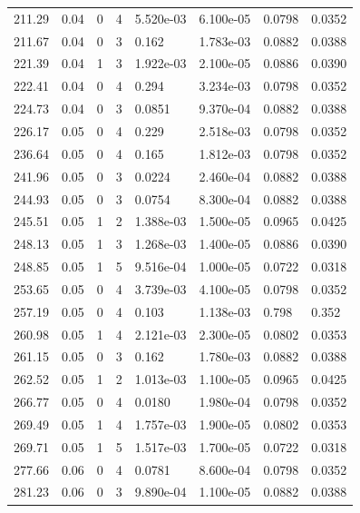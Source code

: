 \documentclass[preview]{standalone}
\begin{document}
{{{\begin{tabular}{L{1.2cm}C{1.2cm} C{0.3cm}C{0.5cm} C{1.4cm}C{1.4cm} C{1.4cm}C{1.4cm}}
  211.29  &  0.04  & 0     &  4 &  5.520e-03  & 6.100e-05  & 0.0798 &  0.0352   \\ 
  211.67  &  0.04  & 0     &  3 &  0.162  & 1.783e-03  & 0.0882 &  0.0388   \\ 
  221.39  &  0.04  & 1     &  3 &  1.922e-03  & 2.100e-05  & 0.0886 &  0.0390   \\ 
  222.41  &  0.04  & 0     &  4 &  0.294  & 3.234e-03  & 0.0798 &  0.0352   \\ 
  224.73  &  0.04  & 0     &  3 &  0.0851  & 9.370e-04  & 0.0882 &  0.0388   \\ 
  226.17  &  0.05  & 0     &  4 &  0.229  & 2.518e-03  & 0.0798 &  0.0352   \\ 
  236.64  &  0.05  & 0     &  4 &  0.165  & 1.812e-03  & 0.0798 &  0.0352   \\ 
  241.96  &  0.05  & 0     &  3 &  0.0224  & 2.460e-04  & 0.0882 &  0.0388   \\ 
  244.93  &  0.05  & 0     &  3 &  0.0754  & 8.300e-04  & 0.0882 &  0.0388   \\ 
  245.51  &  0.05  & 1     &  2 &  1.388e-03  & 1.500e-05  & 0.0965 &  0.0425   \\ 
  248.13  &  0.05  & 1     &  3 &  1.268e-03  & 1.400e-05  & 0.0886 &  0.0390   \\ 
  248.85  &  0.05  & 1     &  5 &  9.516e-04  & 1.000e-05  & 0.0722 &  0.0318   \\ 
  253.65  &  0.05  & 0     &  4 &  3.739e-03  & 4.100e-05  & 0.0798 &  0.0352   \\ 
  257.19  &  0.05  & 0     &  4 &  0.103  & 1.138e-03  & 0.798 &  0.352   \\ 
  260.98  &  0.05  & 1     &  4 &  2.121e-03  & 2.300e-05  & 0.0802 &  0.0353   \\ 
  261.15  &  0.05  & 0     &  3 &  0.162  & 1.780e-03  & 0.0882 &  0.0388   \\ 
  262.52  &  0.05  & 1     &  2 &  1.013e-03  & 1.100e-05  & 0.0965 &  0.0425   \\ 
  266.77  &  0.05  & 0     &  4 &  0.0180  & 1.980e-04  & 0.0798 &  0.0352   \\ 
  269.49  &  0.05  & 1     &  4 &  1.757e-03  & 1.900e-05  & 0.0802 &  0.0353   \\ 
  269.71  &  0.05  & 1     &  5 &  1.517e-03  & 1.700e-05  & 0.0722 &  0.0318   \\ 
  277.66  &  0.06  & 0     &  4 &  0.0781  & 8.600e-04  & 0.0798 &  0.0352   \\ 
  281.23  &  0.06  & 0     &  3 &  9.890e-04  & 1.100e-05  & 0.0882 &  0.0388   \\ 

\end{tabular}}}}
\end{document}
